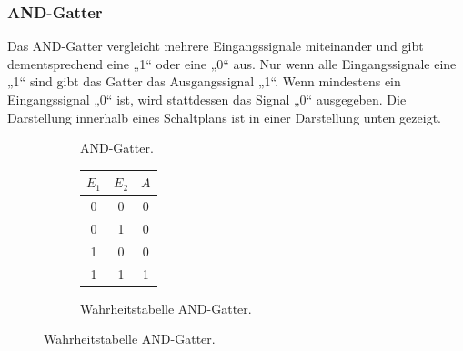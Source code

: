   \subsubsection{AND-Gatter}
    Das AND-Gatter vergleicht mehrere Eingangssignale miteinander 
    und gibt dementsprechend eine „1“ oder eine „0“ aus. 
    Nur wenn alle Eingangssignale eine „1“ sind gibt das Gatter das Ausgangssignal „1“.
    Wenn mindestens ein Eingangssignal „0“ ist, wird stattdessen das Signal „0“ ausgegeben.
    Die Darstellung innerhalb eines Schaltplans ist in einer Darstellung unten gezeigt.
      \begin{figure}[H]
       \begin{subfigure}[t]{0.48\textwidth}%
        \centering
        \caption{AND-Gatter.\cite{tikz}}
        \vspace{15pt}
      \end{subfigure}
      \hfill
      \begin{subfigure}[t]{0.48\textwidth}
        \centering
        \vspace{0pt}
        \caption{Wahrheitstabelle AND-Gatter.\cite{digbau}}
        \begin{tabular}{c c c}
          \toprule
          $E_1$ & $E_2$ & $A$\\
          \midrule
          0 & 0 & 0\\
          0 & 1  & 0\\
          1 & 0  & 0\\
          1 & 1 & 1 \\
          \bottomrule
        \end{tabular}
      \end{subfigure}
    \end{figure}
